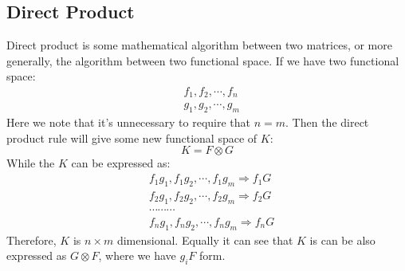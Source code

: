 \subsection{Direct Product}
%
%
%
Direct product is some mathematical algorithm between two matrices, or
more generally, the algorithm between two functional space. If we have
two functional space:
\begin{align}\label{}
  & f_{1}, f_{2}, \cdots, f_{n} \nonumber \\
  & g_{1}, g_{2}, \cdots, g_{m}
\end{align}
Here we note that it's unnecessary to require that $n=m$. Then the
direct product rule will give some new functional space of $K$:
\begin{equation}\label{}
  K = F\otimes G
\end{equation}
While the $K$ can be expressed as:
\begin{align}\label{}
  & f_{1}g_{1}, f_{1}g_{2}, \cdots, f_{1}g_{m} \Rightarrow f_{1}G \nonumber \\
  & f_{2}g_{1}, f_{2}g_{2}, \cdots, f_{2}g_{m} \Rightarrow f_{2}G \nonumber \\
  & \cdots      \cdots     \cdots \nonumber \\
  & f_{n}g_{1}, f_{n}g_{2}, \cdots, f_{n}g_{m} \Rightarrow f_{n}G
\end{align}
Therefore, $K$ is $n\times m$ dimensional. Equally it can see that $K$
is can be also expressed as $G\otimes F$, where we have $g_{i}F$ form.

